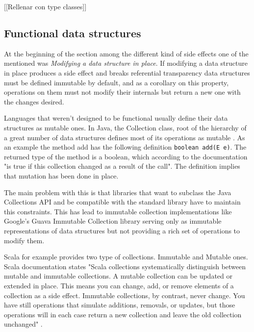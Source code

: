 \documentclass[../main.tex]{subfiles}
\begin{document}
[[Rellenar con type classes]]

\subsection{Functional data structures} At the beginning of the section among
the different kind of side effects one of the mentioned was \textit{Modifying a
data structure in place}. If modifying a data structure in place produces a side
effect and breaks referential transparency data structures must be defined
immutable by default, and as a corollary on this property, operations on them
must not modify their internals but return a new one with the changes desired.

Languages that weren't designed to be functional usually define their data
structures as mutable ones. In Java, the Collection class, root of the hierarchy
of a great number of data structures defines most of its operations as mutable
\autocite{Collection}. As an example the method add has the following definition
\texttt{boolean add(E e)}. The returned type of the method is a boolean, which
according to the documentation "is true if this collection changed as a result
of the call". The definition implies that mutation has been done in place.

The main problem with this is that libraries that want to subclass the Java
Collections API and be compatible with the standard library have to maintain
this constraints. This has lead to immutable collection implementations like
Google's Guava Immutable Collection library \autocite{ImmutableCollectionAPI}
serving only as immutable representations of data structures but not providing a
rich set of operations to modify them.

Scala for example provides two type of collections. Immutable and Mutable ones.
Scala documentation states "Scala collections systematically distinguish between
mutable and immutable collections. A mutable collection can be updated or
extended in place. This means you can change, add, or remove elements of a
collection as a side effect. Immutable collections, by contrast, never change.
You have still operations that simulate additions, removals, or updates, but
those operations will in each case return a new collection and leave the old
collection unchanged" \autocite{MutableDocumentation}.
\end{document}
